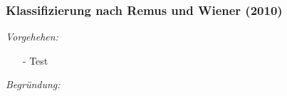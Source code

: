 \noindent
\subsubsection{Klassifizierung nach Remus und Wiener (2010)}
\textit{Vorgehehen:}\\\noindent
\begin{itemize}\itemsep0pt
\item[-]Test
\end{itemize}
\noindent
\textit{Begründung:}\\\noindent
